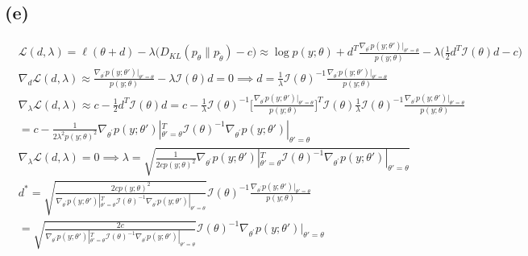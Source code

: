 \documentclass{article}
\begin{document}
\subsection*{(e)}
\begin{align*}
    & \mathcal{L}(d,\lambda)=\ell(\theta+d)-\lambda\Big(D_{KL}(p_{\theta}\|p_{\tilde{\theta}})-c\Big)\approx\log p(y;\theta)+d^{T}\frac{\nabla_{\theta^{'}}p(y;\theta')|_{\theta'=\theta}}{p(y;\theta)}-\lambda\Big(\frac{1}{2}d^{T}\mathcal{I}(\theta)d-c\Big)                                                                                            \\
    & \nabla_{d}\mathcal{L}(d,\lambda)\approx\frac{\nabla_{\theta^{'}}p(y;\theta')|_{\theta'=\theta}}{p(y;\theta)}-\lambda\mathcal{I}(\theta)d=0\implies d=\frac{1}{\lambda}\mathcal{I}(\theta)^{-1}\frac{\nabla_{\theta^{'}}p(y;\theta')|_{\theta'=\theta}}{p(y;\theta)}                                                                                  \\
    & \nabla_{\lambda}\mathcal{L}(d,\lambda)\approx c-\frac{1}{2}d^{T}\mathcal{I}(\theta)d=c-\frac{1}{\lambda}\mathcal{I}(\theta)^{-1}\Big[\frac{\nabla_{\theta^{'}}p(y;\theta')|_{\theta'=\theta}}{p(y;\theta)}\Big]^{T}\mathcal{I}(\theta)\frac{1}{\lambda}\mathcal{I}(\theta)^{-1}\frac{\nabla_{\theta^{'}}p(y;\theta')|_{\theta'=\theta}}{p(y;\theta)} \\
    & =c-\frac{1}{2\lambda^{2}p(y;\theta)^{2}}\nabla_{\theta^{'}}p(y;\theta')|_{\theta'=\theta}^{T}\mathcal{I}(\theta)^{-1}\nabla_{\theta^{'}}p(y;\theta')|_{\theta'=\theta}                                                                                                                                                                               \\
    & \nabla_{\lambda}\mathcal{L}(d,\lambda)=0\implies\lambda=\sqrt{\frac{1}{2cp(y;\theta)^{2}}\nabla_{\theta^{'}}p(y;\theta')|_{\theta'=\theta}^{T}\mathcal{I}(\theta)^{-1}\nabla_{\theta^{'}}p(y;\theta')|_{\theta'=\theta}}                                                                                                                             \\
    & d^{*}=\sqrt{\frac{2cp(y;\theta)^{2}}{\nabla_{\theta^{'}}p(y;\theta')|_{\theta'=\theta}^{T}\mathcal{I}(\theta)^{-1}\nabla_{\theta^{'}}p(y;\theta')|_{\theta'=\theta}}}\mathcal{I}(\theta)^{-1}\frac{\nabla_{\theta^{'}}p(y;\theta')|_{\theta'=\theta}}{p(y;\theta)}                                                                                   \\
    & =\sqrt{\frac{2c}{\nabla_{\theta^{'}}p(y;\theta')|_{\theta'=\theta}^{T}\mathcal{I}(\theta)^{-1}\nabla_{\theta^{'}}p(y;\theta')|_{\theta'=\theta}}}\mathcal{I}(\theta)^{-1}\nabla_{\theta^{'}}p(y;\theta')|_{\theta'=\theta}
\end{align*}
\end{document}
